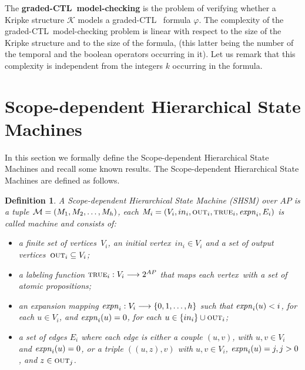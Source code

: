 \documentclass[letterpaper,twocolumn,10pt]{article}
\newtheorem{definition}{Definition}
\def    \ctl        {\mbox{\textsc{CTL }\xspace}}
\def    \K          {\mathcal{K}}
\newcommand{\VHSM}{SHSM}
\newcommand{\OUT} {\mbox{\sc out}}
\newcommand{\prop}{\mbox{{\sc true}}}
\newcommand{\vertex}{\mbox{vertex}}   \newcommand{\vertices}{\mbox{vertices}}
\begin{document}
The \textbf{graded-\ctl model-checking} is the problem of
verifying whether a Kripke structure $\K$ models a graded-\ctl
formula $\varphi$.
The complexity of the graded-\ctl model-checking problem
is linear with respect to the size of
the Kripke structure and to the size of the formula,
(this latter being the number of the temporal and the boolean
operators occurring in it). Let us remark that this complexity is
independent from the integers $k$ occurring in the formula.

\section{Scope-dependent  Hierarchical State Machines}\label{sec:hierarDefinition}
In this section we  formally define the Scope-dependent Hierarchical State Machines and
recall some known results.
The Scope-dependent Hierarchical State Machines are defined as follows.
\begin{definition}
A {\em Scope-dependent Hierarchical State Machine}
(\VHSM) over $AP$ is a tuple ${\cal M}= (M_1,M_2,\ldots,M_h)$, each
$M_i=(V_i,in_i,\OUT_i, \prop_i,\expand_i, E_i)$ is called {\em
machine} and consists of:
\begin{itemize}
\item a finite set of \vertices\ $V_i$,
an {\em initial} \vertex\ $in_i \in V_i$
and a set of {\em output} \vertices\ $\OUT_i \subseteq V_i$;
\item a labeling function $ \prop_i: V_i \longrightarrow 2^{AP}$ that
maps each \vertex\ with a set of atomic propositions;
\item an expansion mapping $\mathit{expn}_i: V_i \longrightarrow \{0,1,\ldots,h\} $
such that $\mathit{expn}_i(u) < i$, for each $u \in V_i$, and
$\mathit{expn}_i(u)=0$, for each $u \in \{in_i \} \cup \OUT_i$;
\item a set of edges $E_i$ where each edge is
either a couple $(u, v)$, with $u, v \in V_i$ and
$\mathit{expn}_i(u) =0$, or a triple $((u,z),v)$ with
$u,v\in V_i$, $\mathit{expn}_i(u)=j, j>0$, and
$z \in \OUT_j$.
\end{itemize}
\end{definition}
\end{document}
